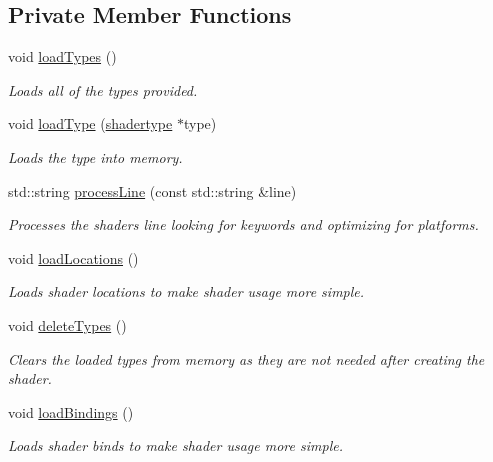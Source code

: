 \subsection*{Private Member Functions}
\begin{DoxyCompactItemize}
\item 
void \hyperlink{classflounder_1_1shader_a6e6e2fb4699edf3e31a2db8cc0537d54}{load\+Types} ()
\begin{DoxyCompactList}\small\item\em Loads all of the types provided. \end{DoxyCompactList}\item 
void \hyperlink{classflounder_1_1shader_a6b9dd723ad226438a710cac8303841e5}{load\+Type} (\hyperlink{structflounder_1_1shadertype}{shadertype} $\ast$type)
\begin{DoxyCompactList}\small\item\em Loads the type into memory. \end{DoxyCompactList}\item 
std\+::string \hyperlink{classflounder_1_1shader_ad80001da433e7afbd646fe2d19ac8b4a}{process\+Line} (const std\+::string \&line)
\begin{DoxyCompactList}\small\item\em Processes the shaders line looking for keywords and optimizing for platforms. \end{DoxyCompactList}\item 
void \hyperlink{classflounder_1_1shader_a01e50af930469630a051f8bcf9a74897}{load\+Locations} ()
\begin{DoxyCompactList}\small\item\em Loads shader locations to make shader usage more simple. \end{DoxyCompactList}\item 
void \hyperlink{classflounder_1_1shader_a12948c1607867de569f1cd596c923623}{delete\+Types} ()
\begin{DoxyCompactList}\small\item\em Clears the loaded types from memory as they are not needed after creating the shader. \end{DoxyCompactList}\item 
void \hyperlink{classflounder_1_1shader_ababc32f14fa38c2c3e0337c5537b1dcd}{load\+Bindings} ()
\begin{DoxyCompactList}\small\item\em Loads shader binds to make shader usage more simple. \end{DoxyCompactList}\end{DoxyCompactItemize}


